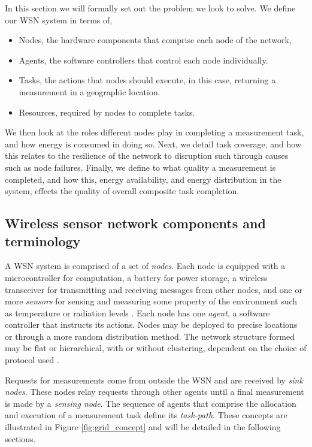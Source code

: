 In this section we will formally set out the problem we look to solve. We define our WSN system in terms of,
\begin{itemize}
	\item Nodes, the hardware components that comprise each node of the network,
	\item Agents, the software controllers that control each node individually.
	\item Tasks, the actions that nodes should execute, in this case, returning a measurement in a geographic location.
	\item Resources, required by nodes to complete tasks.  
\end{itemize}
We then look at the roles different nodes play in completing a measurement task, and how energy is consumed in doing so. Next, we detail task coverage, and how this relates to the resilience of the network to disruption such through causes such as node failures. Finally, we define to what quality a measurement is completed, and how this, energy availability, and energy distribution in the system, effects the quality of overall composite task completion. 

\subsection{Wireless sensor network components and terminology}

A WSN system is comprised of a set of \textit{nodes}. Each node is equipped with a microcontroller for computation, a battery for power storage, a wireless transceiver for  transmitting and receiving messages from other nodes, and one or more \textit{sensors} for sensing and measuring some property of the environment such as temperature or radiation levels \citep{muhammad_r_ahmed_2012_1072589}. Each node has one \textit{agent}, a software controller that instructs its actions. Nodes may be deployed to precise locations or through a more random distribution method. The network structure formed may be flat or hierarchical, with or without clustering, dependent on the choice of protocol used \citep{Carlos-Mancilla2016b}. 

Requests for measurements come from outside the WSN and are received by \textit{sink nodes}. These nodes relay requests through other agents until a final measurement is made by a \textit{sensing node}. The sequence of agents that comprise the allocation and execution of a measurement task define its \textit{task-path}. These concepts are illustrated in Figure \ref{fig:grid_concept} and will be detailed in the following sections.